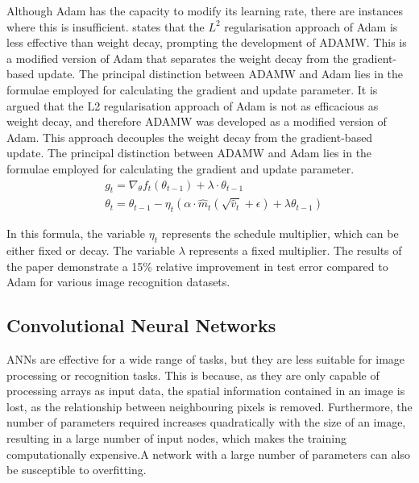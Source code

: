 \documentclass[
a4paper, 
12pt,
grayscalebody, %
abstract=on,
twoside, BCOR10mm, 12pt, DIV13,headinclude, footexclude, final, abstracton, openright
]{ibireprt}
\numberwithin{equation}{chapter}
\numberwithin{table}{chapter}
\numberwithin{figure}{chapter}
\numberwithin{algorithm}{chapter}
\numberwithin{example}{chapter}
\numberwithin{example}{chapter}
\begin{document}
Although Adam has the capacity to modify its learning rate, there are instances where this is insufficient. \citet{Loshchilov2017}  states that the $L^2$ regularisation approach of Adam is less effective than weight decay, prompting the development of ADAMW. This is a modified version of Adam that separates the weight decay from the gradient-based update. The principal distinction between ADAMW and Adam lies in the formulae employed for calculating the gradient and update parameter.
It is argued that the L2 regularisation approach of Adam is not as efficacious as weight decay, and therefore ADAMW was developed as a modified version of Adam. This approach decouples the weight decay from the gradient-based update. The principal distinction between ADAMW and Adam lies in the formulae employed for calculating the gradient and update parameter. 
\begin{align}
	&g_t  = \nabla_\theta f_t(\theta_{t-1})+\lambda\cdot\theta_{t-1}\\
	&\theta_t = \theta_{t-1}-\eta_t (\alpha\cdot\hat{m}_t(\sqrt{\hat{v}_t}+\epsilon)+\lambda\theta_{t-1})
\end{align}  

In this formula, the variable $\eta_t$ represents the schedule multiplier, which can be either fixed or decay. The variable $\lambda$ represents a fixed multiplier. The results of the paper demonstrate a 15\% relative improvement in test error compared to Adam for various image recognition datasets.



\subsection{Convolutional Neural Networks}
ANNs are effective for a wide range of tasks, but they are less suitable for image processing or recognition tasks. This is because, as they are only capable of processing arrays as input data, the spatial information contained in an image is lost, as the relationship between neighbouring pixels is removed. Furthermore, the number of parameters required increases quadratically with the size of an image, resulting in a large number of input nodes, which makes the training computationally expensive.A network with a large number of parameters can also be susceptible to overfitting.
\end{document}
